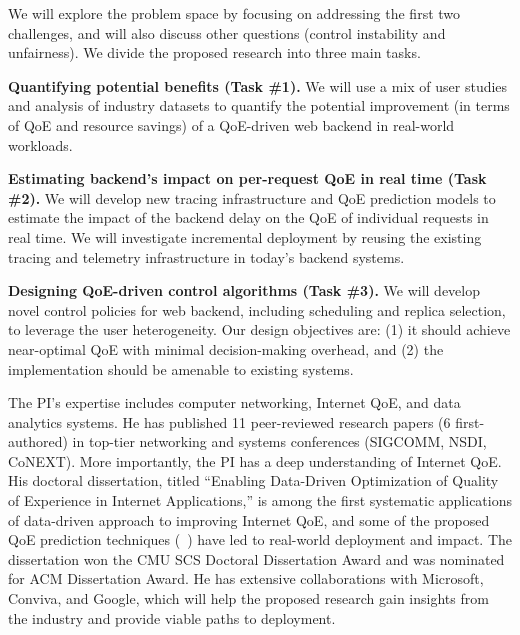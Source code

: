 We will explore the problem space by focusing on addressing the first two challenges, and will also discuss other questions (\eg control instability and unfairness).
We divide the proposed research into three main tasks. 

\begin{packedenumerate}
\item{\bf Quantifying potential benefits (Task \#1).}
We will use a mix of user studies and analysis of industry datasets to quantify the potential improvement (in terms of QoE and resource savings) of a QoE-driven web backend in real-world workloads. %

\item{\bf Estimating backend's impact on per-request QoE in real time (Task \#2).}
We will develop new tracing infrastructure and QoE prediction models to estimate the impact of the backend delay on the QoE of individual requests in real time. We will investigate
incremental deployment by reusing the existing tracing and telemetry infrastructure in today's backend systems.

\item{\bf Designing QoE-driven control algorithms (Task \#3).}
We will develop novel control policies for web backend, including scheduling and replica selection, to leverage the user heterogeneity. Our design objectives are: (1) it should achieve near-optimal QoE with minimal decision-making overhead, and (2) the implementation should be amenable to existing systems.

\end{packedenumerate}


The PI's expertise includes computer networking, Internet QoE, and data analytics systems.
He has published 11 peer-reviewed research papers (6 first-authored) in top-tier networking and systems conferences (\ie SIGCOMM, NSDI, CoNEXT).
More importantly, the PI has a deep understanding of Internet QoE. His doctoral dissertation, titled ``Enabling Data-Driven Optimization of Quality of Experience in Internet Applications,'' is among the first systematic applications of data-driven approach to improving Internet QoE, and some of the proposed QoE prediction techniques (\eg~\cite{cfa,c3}) have led to real-world deployment and impact. The dissertation won the CMU SCS Doctoral Dissertation Award and was nominated for ACM Dissertation Award.
He has extensive collaborations with Microsoft, Conviva, and Google, which will help the proposed research gain insights from the industry and provide viable paths to deployment.

